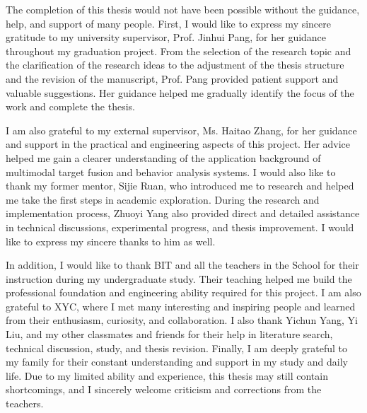 
\begin{acknowledgements}
The completion of this thesis would not have been possible without the guidance, help, and support of many people. First, I would like to express my sincere gratitude to my university supervisor, Prof. Jinhui Pang, for her guidance throughout my graduation project. From the selection of the research topic and the clarification of the research ideas to the adjustment of the thesis structure and the revision of the manuscript, Prof. Pang provided patient support and valuable suggestions. Her guidance helped me gradually identify the focus of the work and complete the thesis.

I am also grateful to my external supervisor, Ms. Haitao Zhang, for her guidance and support in the practical and engineering aspects of this project. Her advice helped me gain a clearer understanding of the application background of multimodal target fusion and behavior analysis systems. I would also like to thank my former mentor, Sijie Ruan, who introduced me to research and helped me take the first steps in academic exploration. During the research and implementation process, Zhuoyi Yang also provided direct and detailed assistance in technical discussions, experimental progress, and thesis improvement. I would like to express my sincere thanks to him as well.

In addition, I would like to thank BIT and all the teachers in the School for their instruction during my undergraduate study. Their teaching helped me build the professional foundation and engineering ability required for this project. I am also grateful to XYC, where I met many interesting and inspiring people and learned from their enthusiasm, curiosity, and collaboration. I also thank Yichun Yang, Yi Liu, and my other classmates and friends for their help in literature search, technical discussion, study, and thesis revision. Finally, I am deeply grateful to my family for their constant understanding and support in my study and daily life. Due to my limited ability and experience, this thesis may still contain shortcomings, and I sincerely welcome criticism and corrections from the teachers.
\end{acknowledgements}
